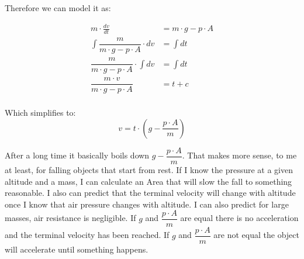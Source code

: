 \documentclass[12pt,letterpaper,final]{article}
\begin{document}
Therefore we can model it as:

\begin{equation}
\begin{align}
					m\cdot\tfrac{dv}{dt} &= m \cdot g - p \cdot A\\				
\int\dfrac{m}{m \cdot g - p \cdot A}\cdot dv &= \int dt\\
\dfrac{m}{m \cdot g - p \cdot A}\cdot \int dv &= \int dt\\
\dfrac{m \cdot v}{m \cdot g - p \cdot A} &= t + c\\
\end{align}
\end{equation}

Which simplifies to:
\begin{equation}
v = t \cdot \left(g - \dfrac{p \cdot A}{m} \right)
\end{equation}

After a long time it basically boils down $g - \dfrac{p \cdot A}{m}$. That makes more sense, to me at least, for falling objects that start from rest. If I know the pressure at a given altitude and a mass, I can calculate an Area that will slow the fall to something reasonable. I also can predict that the terminal velocity will change with altitude once I know that air pressure changes with altitude. I can also predict for large masses, air resistance is negligible. If $g$ and  $\dfrac{p \cdot A}{m}$ are equal there is no acceleration and the terminal velocity has been reached. If $g$ and $\dfrac{p \cdot A}{m}$ are not equal the object will accelerate until something happens.
\end{document}
